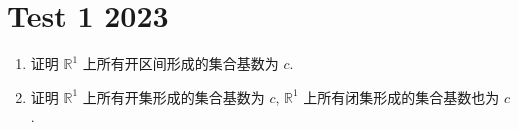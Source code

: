 \documentclass[../main.tex]{subfiles}
\begin{document}
\ifSubfilesClassLoaded{

    
}{}

\chapter{ Test 1 2023 }
\begin{exercise}{}{}
\begin{enumerate}
    \item 证明 $\mathbb{R}^1$ 上所有开区间形成的集合基数为 $c$.
    \item 证明 $\mathbb{R}^1$ 上所有开集形成的集合基数为 $c$, $\mathbb{R}^1$ 上所有闭集形成的集合基数也为 $c$.
\end{enumerate}
\end{exercise}
\end{document}
